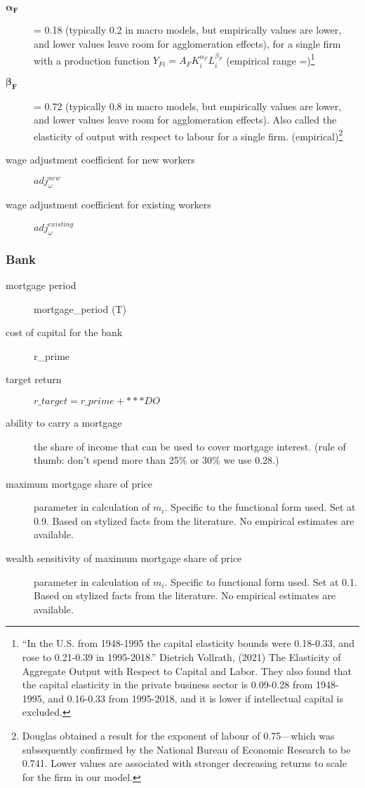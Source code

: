 \begin{description}
\item  [$\mathbf{\alpha_F}$] = 0.18 (typically 0.2 in macro models, but empirically values are lower, and lower values leave room for agglomeration effects),  for a single firm with a production function $Y_{Fi}=A_F K_i^{\alpha_F }L^{\beta_F}_i$ (empirical range =)\footnote{``In the U.S. from 1948-1995 the capital elasticity bounds were 0.18-0.33, and rose to 0.21-0.39 in 1995-2018.'' Dietrich Vollrath, (2021) The Elasticity of Aggregate Output with Respect to Capital and Labor. They also found that the capital elasticity in the private business sector is 0.09-0.28 from 1948-1995, and 0.16-0.33 from 1995-2018, and it is lower if intellectual capital is excluded.}

\item  [$\mathbf{\beta_F}$] = 0.72 (typically 0.8 in macro models, but empirically values are lower, and lower values leave room for agglomeration effects). Also called the elasticity of output with respect to labour for a single firm. (empirical)\footnote{Douglas  obtained a result for the exponent of labour of 0.75—which was subsequently confirmed by the National Bureau of Economic Research to be 0.741. Lower values  are associated with stronger decreasing returns to scale for the firm in our model.} 

\item [wage adjustment coefficient for new workers ] $adj^{new}_\omega$

\item [wage adjustment coefficient for existing workers] $adj^{existing}_\omega$
\end{description}


\subsubsection{Bank} %
\begin{description}
\item [mortgage period]  mortgage\_period (T)
\item [cost of capital for the bank] r\_prime
\item [target return] $r\_target = r\_prime + ***DO$

\item [{ability to carry a mortgage}] the share of income that can be used to cover mortgage interest. (rule of thumb: don't spend more than 25\% or 30\% we use 0.28.)
\item [maximum mortgage share of price] parameter in calculation of $m_i$. Specific to the functional form used. Set at 0.9. Based on stylized facts from the literature.  No empirical estimates are available. 
\item [wealth sensitivity of maximum mortgage share of price] parameter in calculation of $m_i$. Specific to functional form used. Set at 0.1. Based on stylized facts from the literature.  No empirical estimates are available. 

\end{description}

